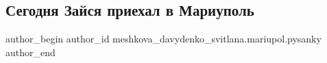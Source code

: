  
 
 
 
 

\subsection{Сегодня Зайся приехал в Мариуполь}
\label{sec:28_03_2018.fb.meshkova_davydenko_svitlana.mariupol.pysanky.2.segodnja_zajsja_priehal_v_mariupol}

\ifcmt
 author_begin
   author_id meshkova_davydenko_svitlana.mariupol.pysanky
 author_end
\fi
